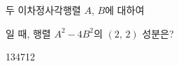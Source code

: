 \hspace*{2mm}\begin{minipage}[t]{\dimexpr\linewidth-2mm\relax}\vspace{0pt}
두 이차정사각행렬 $A$, $B$에 대하여 \par\smallskip{}\par\smallskip\noindent 일 때, 행렬 $A^2-4B^2$의 $(2,\,2)$ 성분은?
\begin{choices32}{1}{3}{4}{7}{12}\end{choices32}\end{minipage}
